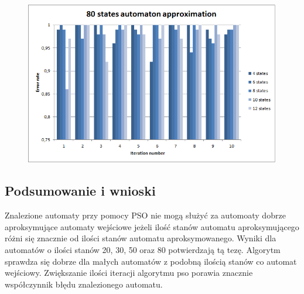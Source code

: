 \documentclass[runningheads,a4paper]{llncs}
\begin{document}
\begin{figure}
\centering
\includegraphics[scale=1]{10.png}
\end{figure} 

\FloatBarrier
\subsection{Podsumowanie i wnioski}

Znalezione automaty przy pomocy PSO nie mogą służyć za automoaty dobrze aproksymujące automaty wejściowe jeżeli ilość stanów automatu aproksymującego różni się znacznie od ilości stanów automatu aproksymowanego. Wyniki dla automatów o ilości stanów 20, 30, 50 oraz 80 potwierdzają tą tezę. Algorytm sprawdza się dobrze dla małych automatów z podobną ilością stanów co automat wejściowy. Zwiększanie ilości iteracji algorytmu pso porawia znacznie współczynnik błędu znalezionego automatu. \\
\end{document}
